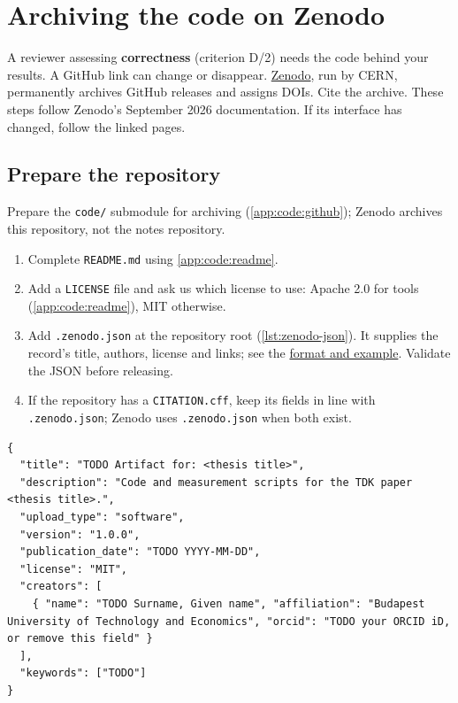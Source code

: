 \chapter{Archiving the code on Zenodo}\label{app:zenodo}
A reviewer assessing \textbf{correctness} (criterion D/2) needs the code behind your results. A GitHub link can change or disappear.
\href{https://zenodo.org/}{Zenodo}, run by CERN, permanently archives GitHub releases and assigns DOIs. Cite the archive.
These steps follow Zenodo's September 2026 documentation. If its interface has changed, follow the linked pages.

\section{Prepare the repository}
Prepare the \texttt{code/} submodule for archiving (\cref{app:code:github}); Zenodo archives this repository, not the notes repository.
\begin{enumerate}
  \item Complete \texttt{README.md} using \cref{app:code:readme}.
  \item Add a \texttt{LICENSE} file and ask us which license to use: Apache 2.0 for tools (\cref{app:code:readme}), MIT otherwise.
  \item Add \texttt{.zenodo.json} at the repository root (\cref{lst:zenodo-json}). It supplies the record's title, authors, license and links; see the \href{https://help.zenodo.org/docs/github/describe-software/zenodo-json/}{format and example}. Validate the JSON before releasing.
  \item If the repository has a \texttt{CITATION.cff}, keep its fields in line with \texttt{.zenodo.json}; Zenodo uses \texttt{.zenodo.json} when both exist.
\end{enumerate}

\begin{listing}[!ht]
\begin{verbatim}
{
  "title": "TODO Artifact for: <thesis title>",
  "description": "Code and measurement scripts for the TDK paper <thesis title>.",
  "upload_type": "software",
  "version": "1.0.0",
  "publication_date": "TODO YYYY-MM-DD",
  "license": "MIT",
  "creators": [
    { "name": "TODO Surname, Given name", "affiliation": "Budapest University of Technology and Economics", "orcid": "TODO your ORCID iD, or remove this field" }
  ],
  "keywords": ["TODO"]
}
\end{verbatim}
\caption{A minimal \texttt{.zenodo.json}.}\label{lst:zenodo-json}
\end{listing}

